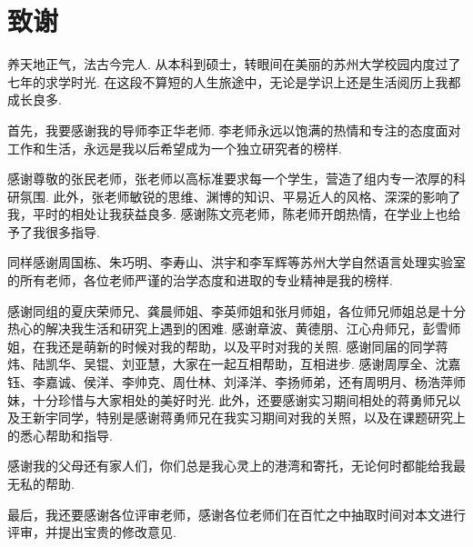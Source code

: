 \chapter{致谢}

养天地正气，法古今完人.
从本科到硕士，转眼间在美丽的苏州大学校园内度过了七年的求学时光.
在这段不算短的人生旅途中，无论是学识上还是生活阅历上我都成长良多.

首先，我要感谢我的导师李正华老师.
李老师永远以饱满的热情和专注的态度面对工作和生活，永远是我以后希望成为一个独立研究者的榜样.

感谢尊敬的张民老师，张老师以高标准要求每一个学生，营造了组内专一浓厚的科研氛围.
此外，张老师敏锐的思维、渊博的知识、平易近人的风格、深深的影响了我，平时的相处让我获益良多.
感谢陈文亮老师，陈老师开朗热情，在学业上也给予了我很多指导.

同样感谢周国栋、朱巧明、李寿山、洪宇和李军辉等苏州大学自然语言处理实验室的所有老师，各位老师严谨的治学态度和进取的专业精神是我的榜样.

感谢同组的夏庆荣师兄、龚晨师姐、李英师姐和张月师姐，各位师兄师姐总是十分热心的解决我生活和研究上遇到的困难.
感谢章波、黄德朋、江心舟师兄，彭雪师姐，在我还是萌新的时候对我的帮助，以及平时对我的关照.
感谢同届的同学蒋炜、陆凯华、吴锟、刘亚慧，大家在一起互相帮助，互相进步.
感谢周厚全、沈嘉钰、李嘉诚、侯洋、李帅克、周仕林、刘泽洋、李扬师弟，还有周明月、杨浩萍师妹，十分珍惜与大家相处的美好时光.
此外，还要感谢实习期间相处的蒋勇师兄以及王新宇同学，特别是感谢蒋勇师兄在我实习期间对我的关照，以及在课题研究上的悉心帮助和指导.

感谢我的父母还有家人们，你们总是我心灵上的港湾和寄托，无论何时都能给我最无私的帮助.

最后，我还要感谢各位评审老师，感谢各位老师们在百忙之中抽取时间对本文进行评审，并提出宝贵的修改意见.

